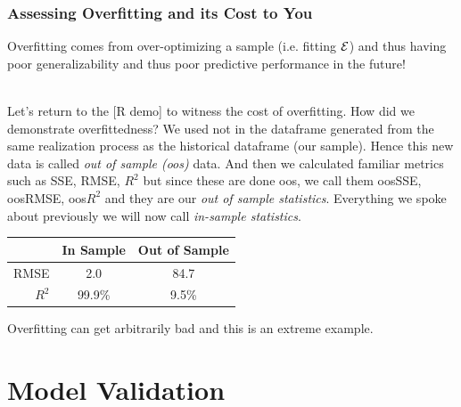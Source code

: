 \documentclass[handout]{beamer}
\begin{document}
\begin{frame}\frametitle{Assessing Overfitting and its Cost to You}
\small
Overfitting comes from over-optimizing a sample (i.e. fitting $\mathcal{E}$) and thus having poor generalizability and thus poor predictive performance in the future! \\~\\ \pause

Let's return to the [R demo] to witness the cost of overfitting. \pause How did we demonstrate overfittedness? \pause We used  not in the dataframe generated from the same realization process as the historical dataframe (our sample). Hence this new data is called \emph{out of sample (oos)} data. And then we calculated familiar metrics such as SSE, RMSE, $R^2$ but since these are done oos, we call them oosSSE, oosRMSE, oos$R^2$ and they are our \emph{out of sample statistics}. Everything we spoke about previously we will now call \emph{in-sample statistics}.

\begin{table}
\centering
\begin{tabular}{rcc}
& In Sample & Out of Sample \\ \hline
RMSE   & 2.0 & 84.7 \\
$R^2$ & 99.9\% & 9.5\%
\end{tabular}
\end{table}

Overfitting can get arbitrarily bad and this is an extreme example.
	
\end{frame}

\section{Model Validation}
\end{document}
